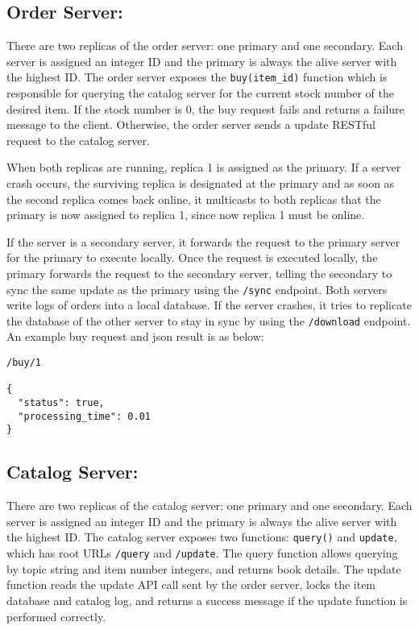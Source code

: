 \documentclass[11pt,]{article}
\begin{document}
\hypertarget{order-server}{%
\subsection{Order Server:}\label{order-server}}

There are two replicas of the order server: one primary and one
secondary. Each server is assigned an integer ID and the primary is
always the alive server with the highest ID. The order server exposes
the \texttt{buy(item\_id)} function which is responsible for querying
the catalog server for the current stock number of the desired item. If
the stock number is 0, the buy request fails and returns a failure
message to the client. Otherwise, the order server sends a update
RESTful request to the catalog server.

When both replicas are running, replica 1 is assigned as the primary. If
a server crash occurs, the surviving replica is designated at the
primary and as soon as the second replica comes back online, it
multicasts to both replicas that the primary is now assigned to replica
1, since now replica 1 must be online.

If the server is a secondary server, it forwards the request to the
primary server for the primary to execute locally. Once the request is
executed locally, the primary forwards the request to the secondary
server, telling the secondary to sync the same update as the primary
using the \texttt{/sync} endpoint. Both servers write logs of orders
into a local database. If the server crashes, it tries to replicate the
database of the other server to stay in sync by using the
\texttt{/download} endpoint. An example buy request and json result is
as below:

\begin{verbatim}
/buy/1

{
  "status": true,
  "processing_time": 0.01
}
\end{verbatim}

\hypertarget{catalog-server}{%
\subsection{Catalog Server:}\label{catalog-server}}

There are two replicas of the catalog server: one primary and one
secondary. Each server is assigned an integer ID and the primary is
always the alive server with the highest ID. The catalog server exposes
two functions: \texttt{query()} and \texttt{update}, which has root URLs
\texttt{/query} and \texttt{/update}. The query function allows querying
by topic string and item number integers, and returns book details. The
update function reads the update API call sent by the order server,
locks the item database and catalog log, and returns a success message
if the update function is performed correctly.
\end{document}
